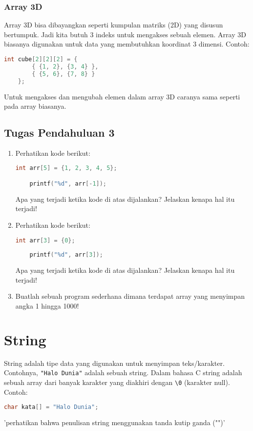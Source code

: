 \subsubsection{Array 3D}

Array 3D bisa dibayangkan seperti kumpulan matriks (2D) yang disusun bertumpuk.
Jadi kita butuh 3 indeks untuk mengakses sebuah elemen.
Array 3D biasanya digunakan untuk data yang membutuhkan koordinat 3 dimensi.
Contoh:
\begin{lstlisting}[language=c]
	int cube[2][2][2] = {
		{ {1, 2}, {3, 4} },
		{ {5, 6}, {7, 8} }
	};
\end{lstlisting}
Untuk mengakses dan mengubah elemen dalam array 3D caranya sama seperti pada array biasanya.

\subsection*{Tugas Pendahuluan 3}
\begin{enumerate}
	\item Perhatikan kode berikut:
	\begin{lstlisting}[language=c]
	int arr[5] = {1, 2, 3, 4, 5};

	printf("%d", arr[-1]);
\end{lstlisting}
Apa yang terjadi ketika kode di atas dijalankan? Jelaskan kenapa hal itu terjadi!
	\item Perhatikan kode berikut:
	\begin{lstlisting}[language=c]
	int arr[3] = {0};
	
	printf("%d", arr[3]);
\end{lstlisting}
Apa yang terjadi ketika kode di atas dijalankan? Jelaskan kenapa hal itu terjadi!
	\item Buatlah sebuah program sederhana dimana terdapat array yang menyimpan angka 1 hingga 1000!

\end{enumerate}

\section{String}

String adalah tipe data yang digunakan untuk menyimpan teks/karakter.
Contohnya, \verb|"Halo Dunia"| adalah sebuah string.
Dalam bahasa C string adalah sebuah array dari banyak karakter yang diakhiri dengan \verb|\0| (karakter null).
Contoh:
\begin{lstlisting}[language=c]
	char kata[] = "Halo Dunia";
\end{lstlisting}
'perhatikan bahwa penulisan string menggunakan tanda kutip ganda ("")'

